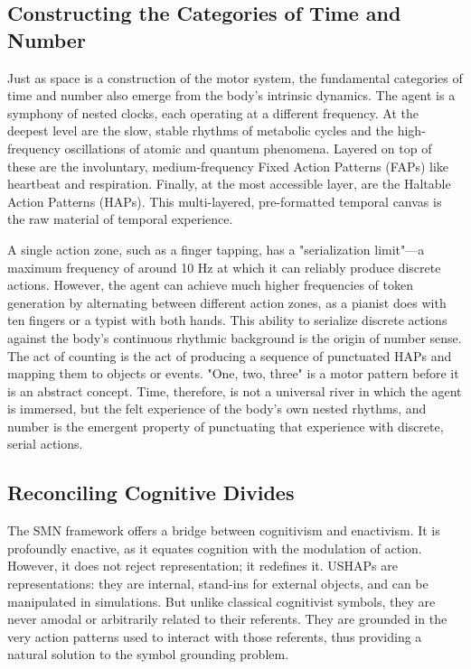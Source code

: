 \subsection{Constructing the Categories of Time and Number}
\label{subsec:time_number}
Just as space is a construction of the motor system, the fundamental categories of time and number also emerge from the body's intrinsic dynamics. The agent is a symphony of nested clocks, each operating at a different frequency. At the deepest level are the slow, stable rhythms of metabolic cycles and the high-frequency oscillations of atomic and quantum phenomena. Layered on top of these are the involuntary, medium-frequency Fixed Action Patterns (FAPs) like heartbeat and respiration. Finally, at the most accessible layer, are the Haltable Action Patterns (HAPs). This multi-layered, pre-formatted temporal canvas is the raw material of temporal experience.

A single action zone, such as a finger tapping, has a "serialization limit"—a maximum frequency of around 10 Hz at which it can reliably produce discrete actions. However, the agent can achieve much higher frequencies of token generation by alternating between different action zones, as a pianist does with ten fingers or a typist with both hands. This ability to serialize discrete actions against the body's continuous rhythmic background is the origin of number sense. The act of counting is the act of producing a sequence of punctuated HAPs and mapping them to objects or events. "One, two, three" is a motor pattern before it is an abstract concept. Time, therefore, is not a universal river in which the agent is immersed, but the felt experience of the body's own nested rhythms, and number is the emergent property of punctuating that experience with discrete, serial actions.

\subsection{Reconciling Cognitive Divides}
\label{subsec:reconciling}
The SMN framework offers a bridge between cognitivism and enactivism. It is profoundly enactive, as it equates cognition with the modulation of action. However, it does not reject representation; it redefines it. USHAPs are representations: they are internal, stand-ins for external objects, and can be manipulated in simulations. But unlike classical cognitivist symbols, they are never amodal or arbitrarily related to their referents. They are grounded in the very action patterns used to interact with those referents, thus providing a natural solution to the symbol grounding problem.


